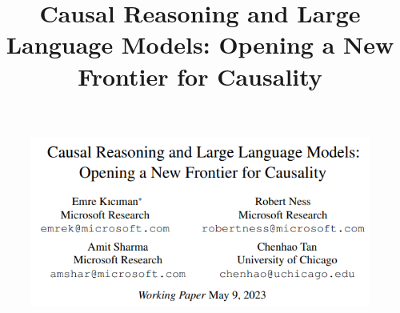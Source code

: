\documentclass{beamer}
\begin{document}
\title[]{Causal Reasoning and Large Language Models: Opening a New Frontier for Causality}
\author {}
\date{}

\begin{frame}
	\begin{figure}
		\centering
		\includegraphics[scale=0.7]{imgs/title.png}
	\end{figure}
\end{frame}


\end{document}
